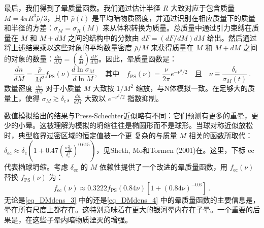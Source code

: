 最后，我们得到了晕质量函数。我们通过估计半径 \( R \) 大致对应于包含质量 \( M = 4\pi R^3 \bar{\rho}/3 \)，其中 \( \bar{\rho}(t) \) 是平均暗物质密度，并通过识别在相应质量下的质量和半径的方差：\( \sigma_M = \sigma_R(M) \) 来从体积转换为质量。总质量中通过引力束缚在质量在 \( M \) 和 \( M + dM \) 之间的结构中的分数由 \( dF = (dF/dM)dM \) 给出。然后通过将上述结果乘以这些对象的平均数量密度 \( \bar{\rho}/M \) 来获得质量在 \( M \) 和 \( M+dM \) 之间的对象的数量：\( \frac{dn}{dM} = \left(\frac{\bar{\rho}}{M}\right) \frac{dF}{dM} \)。因此，晕质量函数是：
\begin{equation}\label{eq_DMdens_3}
\frac{dn}{dM} = \frac{\bar{\rho}}{M^2} f_{\text{PS}}(\nu) \frac{d\ln \sigma_M}{d\ln M}, \quad \text{其中} \quad f_{\text{PS}}(\nu) = \frac{\nu}{2\pi} e^{-\nu^2/2} \quad \text{且} \quad \nu \equiv \frac{\delta_c}{\sigma_M(t)}~.
\end{equation}
数量密度 \( \frac{dn}{dM} \) 对于小质量 \( M \) 大致按 \( 1/M^2 \) 缩放，与N体模拟一致。在足够大的质量上，使得 \( \sigma_M \gtrsim \delta_c \)，\( \frac{dn}{dM} \) 大致以 \( e^{-\nu^2/2} \) 指数抑制。

数值模拟给出的结果与Press-Schechter近似略有不同：它们预测有更多的重晕，更少的小晕。这被理解为模拟的坍缩往往是椭圆形而不是球形。当球对称近似放松时，典型临界过密区域的恒定值被一个更 复杂的与质量 \( M \) 相关的函数所取代：\( \delta_{\text{ec}} \approx \delta_c \left( 1 + 0.47\left(\frac{\sigma_M^2}{\delta_c^2}\right)^{0.615} \right) \)，见Sheth, Mo和Tormen (2001)在。这里，下标 \( \text{ec} \)代表椭球坍缩。考虑 \( \delta_{\text{ec}} \) 的 \( M \) 依赖性提供了一个改进的晕质量函数，用 \( f_{\text{ec}}(\nu) \) 替换 \( f_{\text{PS}}(\nu) \) 为：
\begin{equation}\label{eq_DMdens_4}
f_{\text{ec}}(\nu) \approx 0.3222 f_{\text{PS}}(0.84 \nu)\left[1 + (0.84 \nu)^{-0.6}\right]~. 
\end{equation}
无论是\autoref{eq_DMdens_3} 中的还是\autoref{eq_DMdens_4} 中的晕质量函数的主要信息是，晕在所有尺度上都存在。这特别意味着在更大的银河晕内存在子晕。一个重要的后果是，在这些子晕内暗物质湮灭的增强。

